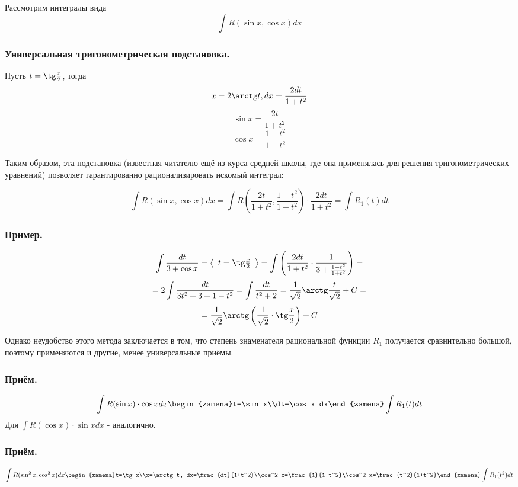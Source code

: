 Рассмотрим интегралы вида 
$$\int R(\sin x,\cos x)dx$$

\subsubsection{Универсальная тригонометрическая подстановка.}
Пусть $t=\tg\frac{x}{2}$, тогда 
$$x=2\arctg t, dx=\frac{2dt}{1+t^2}$$
$$\sin x=\frac{2t}{1+t^2}$$
$$\cos x=\frac{1-t^2}{1+t^2}$$

Таким образом, эта подстановка (известная читателю ещё из курса средней школы, где она применялась для решения тригонометрических уравнений) позволяет гарантированно рационализировать искомый интеграл:

$$\int R(\sin x,\cos x)dx=\int R(\frac{2t}{1+t^2},\frac{1-t^2}{1+t^2})\cdot \frac{2dt}{1+t^2}=\int R_1(t)dt$$

\subsubsection{Пример.}

$$\int \frac{dt}{3+\cos x}=
\left<\begin{array}{c}
t=\tg\frac{x}{2}
\end{array}\right>=
\int\left(\frac{2dt}{1+t^2}\cdot\frac{1}{3+\frac{1-t^2}{1+t^2}}\right)=$$
$$=2\int\frac{dt}{3t^2+3+1-t^2}=\int\frac{dt}{t^2+2}=
\frac{1}{\sqrt{2}}\arctg\frac{t}{\sqrt{2}}+C=$$$$=
\frac{1}{\sqrt{2}}\arctg\left(\frac{1}{\sqrt{2}}\cdot \tg\frac{x}{2}\right)+C$$

Однако неудобство этого метода заключается в том, что степень знаменателя рациональной функции $R_1$ получается сравнительно большой, поэтому применяются и другие, менее универсальные приёмы.

\subsubsection{Приём.}
$$\int R(\sin x)\cdot \cos x dx \begin{zamena}t=\sin x\\dt=\cos x dx\end{zamena}\int R_1(t)dt$$
Для $\int R(\cos x) \cdot \sin x dx$ - аналогично.

\subsubsection{Приём.}
$$\int R(\sin^2 x, \cos^2 x) dx \begin{zamena}t=\tg x\\x=\arctg t, dx=\frac{dt}{1+t^2}\\cos^2 x=\frac{1}{1+t^2}\\cos^2 x=\frac{t^2}{1+t^2}\end{zamena}\int R_1(t^2)dt$$

